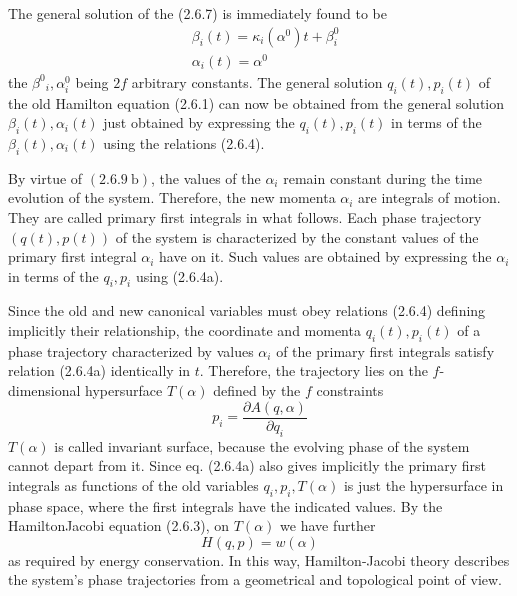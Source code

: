 \documentclass{article}
\begin{document}
The general solution of the (2.6.7) is immediately found to be
$$
\begin{align*}
& \beta_{i}(t)=\kappa_{i}\left(\alpha^{0}\right) t+\beta_{i}^{0}  \tag{2.6.9a}\\
& \alpha_{i}(t)=\alpha^{0} \tag{2.6.9b}
\end{align*}
$$
the $\beta^{0}{ }_{i}, \alpha_{i}^{0}$ being $2 f$ arbitrary constants. The general solution $q_{i}(t), p_{i}(t)$ of the old Hamilton equation (2.6.1) can now be obtained from the general solution $\beta_{i}(t), \alpha_{i}(t)$ just obtained by expressing the $q_{i}(t), p_{i}(t)$ in terms of the $\beta_{i}(t), \alpha_{i}(t)$ using the relations (2.6.4).

By virtue of $(2.6 .9 \mathrm{~b})$, the values of the $\alpha_{i}$ remain constant during the time evolution of the system. Therefore, the new momenta $\alpha_{i}$ are integrals of motion. They are called primary first integrals in what follows. Each phase trajectory $(q(t), p(t))$ of the system is characterized by the constant values of the primary first integral $\alpha_{i}$ have on it. Such values are obtained by expressing the $\alpha_{i}$ in terms of the $q_{i}, p_{i}$ using (2.6.4a).

Since the old and new canonical variables must obey relations (2.6.4) defining implicitly their relationship, the coordinate and momenta $q_{i}(t), p_{i}(t)$ of a phase trajectory characterized by values $\alpha_{i}$ of the primary first integrals satisfy relation (2.6.4a) identically in $t$. Therefore, the trajectory lies on the $f$-dimensional hypersurface $T(\alpha)$ defined by the $f$ constraints
$$
\begin{equation*}
p_{i}=\frac{\partial A(q, \alpha)}{\partial q_{i}} \tag{2.6.10}
\end{equation*}
$$
$T(\alpha)$ is called invariant surface, because the evolving phase of the system cannot depart from it. Since eq. (2.6.4a) also gives implicitly the primary first integrals as functions of the old variables $q_{i}, p_{i}, T(\alpha)$ is just the hypersurface in phase
space, where the first integrals have the indicated values. By the HamiltonJacobi equation (2.6.3), on $T(\alpha)$ we have further
$$
\begin{equation*}
H(q, p)=w(\alpha) \tag{2.6.11}
\end{equation*}
$$
as required by energy conservation. In this way, Hamilton-Jacobi theory describes the system's phase trajectories from a geometrical and topological point of view.
\end{document}
